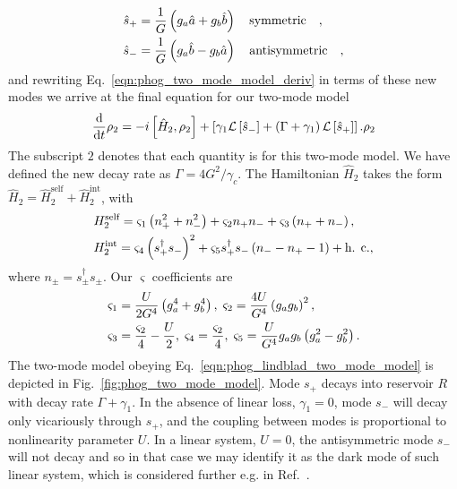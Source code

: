 \begin{align}\label{eqn:phog_rotation}
\hat{s}_+ &= \frac{1}{G} \left(g_a \hat{a} + g_b \hat{b}\right) \qq{symmetric},  \notag \\
%
\hat{s}_- &= \frac{1}{G} \left(g_a \hat{b} - g_b \hat{a}\right) \qq{antisymmetric},
\end{align}
and rewriting Eq.~\ref{eqn:phog_two_mode_model_deriv} in terms of these new modes we arrive at the final equation for our two-mode model
\begin{equation}\label{eqn:phog_lindblad_two_mode_model}
\frac{\mathrm{d}}{\mathrm{d}t} \rho_2 = - i \left[ \hat{H}_2, \rho_2 \right] + \left[ \gamma_1 \mathcal{L}\left[\hat{s}_-\right] + \left(\Gamma + \gamma_1\right) \mathcal{L}\left[\hat{s}_+\right] \right]. \rho_2
\end{equation}
The subscript $2$ denotes that each quantity is for this two-mode model. We have defined the new decay rate as $\Gamma = 4 G^2 / \gamma_c$. The Hamiltonian $\hat{H}_2$ takes the form $\hat{H}_2 = \hat{H}_2^{\text{self}} + \hat{H}_2^{\text{int}}$, with
\begin{align}
&H_2^{\text{self}} = \varsigma_1\left(n_+^2 + n_-^2\right) + \varsigma_2 n_+ n_- + \varsigma_3\left(n_+ + n_-\right), \notag \\
%
&H_2^{\text{int}} = \varsigma_4 \left(s_+^\dagger s_-\right)^2 + \varsigma_5 s_+^\dagger s_- \left(n_- - n_+ - 1\right) + \hc,
\end{align}
where $n_{\pm} = s_{\pm}^\dagger s_\pm$. Our $\varsigma$ coefficients are
\begin{align}
&\varsigma_1 = \frac{U}{2 G^4} \left(g_a^4 + g_b^4\right), \; \varsigma_2 = \frac{4 U}{G^4} \left(g_a g_b\right)^2, \notag \\
%
&\varsigma_3 = \frac{\varsigma_2}{4} - \frac{U}{2}, \; \varsigma_4 = \frac{\varsigma_2}{4}, \; \varsigma_5 = \frac{U}{G^4} g_a g_b \left(g_a^2 - g_b^2\right).
\end{align}
The two-mode model obeying Eq.~\ref{eqn:phog_lindblad_two_mode_model} is depicted in Fig.~\ref{fig:phog_two_mode_model}. Mode $s_+$ decays into reservoir $R$ with decay rate $\Gamma + \gamma_1$. In the absence of linear loss, $\gamma_1=0$, mode $s_-$ will decay only vicariously through $s_+$, and the coupling between modes is proportional to nonlinearity parameter $U$. In a linear system, $U = 0$, the antisymmetric mode $s_-$ will not decay and so in that case we may identify it as the dark mode of such linear system, which is considered further e.g. in Ref.~\cite{Delanty2012}.


